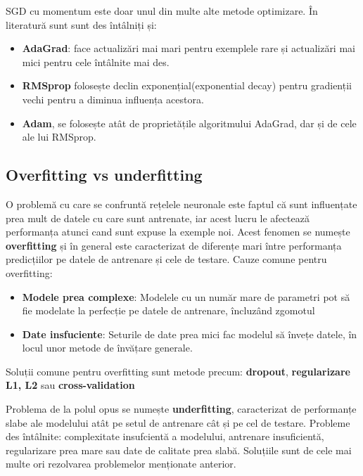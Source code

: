 SGD cu momentum este doar unul din multe alte metode optimizare. În literatură sunt sunt des întâlniți și:

\begin{itemize}
    \item \textbf{AdaGrad}\cite{duchi2011adaptive}: face actualizări mai mari pentru exemplele rare și actualizări mai mici pentru cele întâlnite mai des. 
    \item \textbf{RMSprop}\cite{rmsprop} folosește declin exponențial(exponential decay) pentru gradienții vechi pentru a diminua influența acestora. 
    \item \textbf{Adam}\cite{kingma2014adam}, se folosește atât de proprietățile algoritmului AdaGrad, dar și de cele ale lui RMSprop.
\end{itemize}

\subsection{Overfitting vs underfitting}

O problemă cu care se confruntă rețelele neuronale este faptul că sunt influențate prea mult de datele cu care sunt antrenate, iar acest lucru le afectează performanța atunci cand sunt expuse la exemple noi. Acest fenomen se numește \textbf{overfitting} și în general este caracterizat de diferențe mari între performanța predicțiilor pe datele de antrenare și cele de testare. Cauze comune pentru overfitting:

\begin{itemize}
    \item \textbf{Modele prea complexe}: Modelele cu un număr mare de parametri pot să fie modelate la perfecție pe datele de antrenare, încluzând zgomotul
    \item \textbf{Date insfuciente}: Seturile de date prea mici fac modelul să învețe datele, în locul unor metode de învățare generale.
\end{itemize}

Soluții comune pentru overfitting sunt metode precum: \textbf{dropout}\cite{srivastava2014dropout}, \textbf{regularizare L1, L2} \cite{ng2004feature} sau \textbf{cross-validation} \cite{kohavi1995study}

Problema de la polul opus se numește \textbf{underfitting}, caracterizat de performanțe slabe ale modelului atât pe setul de antrenare cât și pe cel de testare. Probleme des întâlnite: complexitate insufcientă a modelului, antrenare insuficientă, regularizare prea mare sau date de calitate prea slabă.
Soluțiile sunt de cele mai multe ori rezolvarea problemelor menționate anterior.

